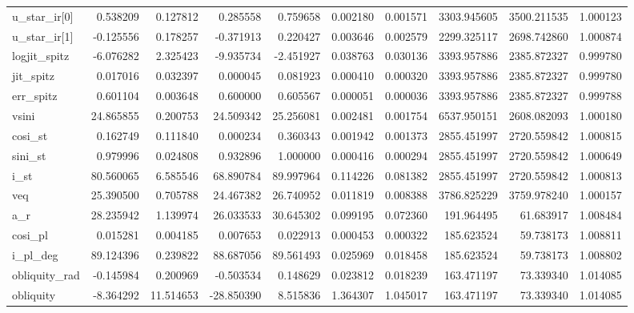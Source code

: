 \begin{tabular}{lrrrrrrrrr}
u\_star\_ir[0]  &     0.538209 &    0.127812 &    0.285558 &     0.759658 &   0.002180 &  0.001571 &  3303.945605 &  3500.211535 &  1.000123 \\
u\_star\_ir[1]  &    -0.125556 &    0.178257 &   -0.371913 &     0.220427 &   0.003646 &  0.002579 &  2299.325117 &  2698.742860 &  1.000874 \\
logjit\_spitz  &    -6.076282 &    2.325423 &   -9.935734 &    -2.451927 &   0.038763 &  0.030136 &  3393.957886 &  2385.872327 &  0.999780 \\
jit\_spitz     &     0.017016 &    0.032397 &    0.000045 &     0.081923 &   0.000410 &  0.000320 &  3393.957886 &  2385.872327 &  0.999780 \\
err\_spitz     &     0.601104 &    0.003648 &    0.600000 &     0.605567 &   0.000051 &  0.000036 &  3393.957886 &  2385.872327 &  0.999788 \\
vsini         &    24.865855 &    0.200753 &   24.509342 &    25.256081 &   0.002481 &  0.001754 &  6537.950151 &  2608.082093 &  1.000180 \\
cosi\_st       &     0.162749 &    0.111840 &    0.000234 &     0.360343 &   0.001942 &  0.001373 &  2855.451997 &  2720.559842 &  1.000815 \\
sini\_st       &     0.979996 &    0.024808 &    0.932896 &     1.000000 &   0.000416 &  0.000294 &  2855.451997 &  2720.559842 &  1.000649 \\
i\_st          &    80.560065 &    6.585546 &   68.890784 &    89.997964 &   0.114226 &  0.081382 &  2855.451997 &  2720.559842 &  1.000813 \\
veq           &    25.390500 &    0.705788 &   24.467382 &    26.740952 &   0.011819 &  0.008388 &  3786.825229 &  3759.978240 &  1.000157 \\
a\_r           &    28.235942 &    1.139974 &   26.033533 &    30.645302 &   0.099195 &  0.072360 &   191.964495 &    61.683917 &  1.008484 \\
cosi\_pl       &     0.015281 &    0.004185 &    0.007653 &     0.022913 &   0.000453 &  0.000322 &   185.623524 &    59.738173 &  1.008811 \\
i\_pl\_deg      &    89.124396 &    0.239822 &   88.687056 &    89.561493 &   0.025969 &  0.018458 &   185.623524 &    59.738173 &  1.008802 \\
obliquity\_rad &    -0.145984 &    0.200969 &   -0.503534 &     0.148629 &   0.023812 &  0.018239 &   163.471197 &    73.339340 &  1.014085 \\
obliquity     &    -8.364292 &   11.514653 &  -28.850390 &     8.515836 &   1.364307 &  1.045017 &   163.471197 &    73.339340 &  1.014085 \\
\bottomrule
\end{tabular}
